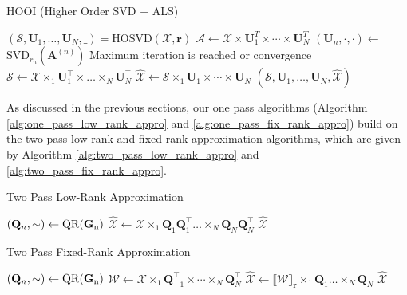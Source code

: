 \begin{algorithm}[!ht]
\caption{HOOI (Higher Order SVD + ALS)} \label{alg:tucker}
\begin{algorithmic}[2]  
\State $(\mathscr{S},\mathbf{U}_1, \dots, \mathbf{U}_N, \_) = $HOSVD$(\mathscr{X},\mathbf{r})$ 
\Repeat
{} 
\State $\mathscr{A} \leftarrow \mathscr{X} \times \mathbf{U}_1^T \times \cdots \times \mathbf{U}_N^T$
\State $(\mathbf{U}_n, \cdot, \cdot)\leftarrow$ $\text{SVD}_{r_n}(\mathbf{A}^{(n)})$
\EndFor
\Until Maximum iteration is reached or convergence
\State $\mathscr{S} \leftarrow \mathscr{X}\times_1 \mathbf{U}_1^\top \times \dots \times_N \mathbf{U}_N^\top$
  \State $\hat{\mathscr{X}} \leftarrow \mathscr{S} \times_1 \mathbf{U}_1 \times \cdots \times \mathbf{U}_N $
  \State \Return $(\mathscr{S},\mathbf{U}_1, \dots, \mathbf{U}_N, \hat{\mathscr{X}})$
\EndFunction 
\end{algorithmic}
\end{algorithm}
As discussed in the previous sections, our one pass algorithms (Algorithm \ref{alg:one_pass_low_rank_appro} and \ref{alg:one_pass_fix_rank_appro}) build on the two-pass low-rank and fixed-rank approximation algorithms, which are given by Algorithm \ref{alg:two_pass_low_rank_appro} and \ref{alg:two_pass_fix_rank_appro}. 
\begin{algorithm}[ht!]
\caption{Two Pass Low-Rank Approximation}\label{alg:two_pass_low_rank_appro}
  \begin{algorithmic}[1]
    \State $(\mathbf{Q}_n, \sim) \leftarrow \rm{QR}(\mathbf{G}_n)$
   \EndFor
   \State $\hat{\mathscr{X}} \leftarrow \mathscr{X} \times_1 \mathbf{Q}_1\mathbf{Q}_1^\top \dots \times_N \mathbf{Q}_N\mathbf{Q}_N^\top$
   \State \Return $\hat{\mathscr{X}}$
   \EndFunction
\end{algorithmic}
\end{algorithm}
\begin{algorithm}[ht!] 
\begin{algorithmic}[1]
\caption{Two Pass Fixed-Rank Approximation}\label{alg:two_pass_fix_rank_appro}
\State $(\mathbf{Q}_n, \sim) \leftarrow \rm{QR}(\mathbf{G}_n)$
\EndFor
\State $\mathscr{W} \leftarrow \mathscr{X} \times_1 \mathbf{Q^\top}_1 \times \cdots \times_N \mathbf{Q}_N^\top$ 
\State $\hat{\mathscr{X}} \leftarrow \llbracket \mathscr{W} \rrbracket _{\mathbf{r}} \times_1 \mathbf{Q}_1 \dots \times_N \mathbf{Q}_N$
\State \Return $\hat{\mathscr{X}}$
\EndFunction
\end{algorithmic}
\end{algorithm}

